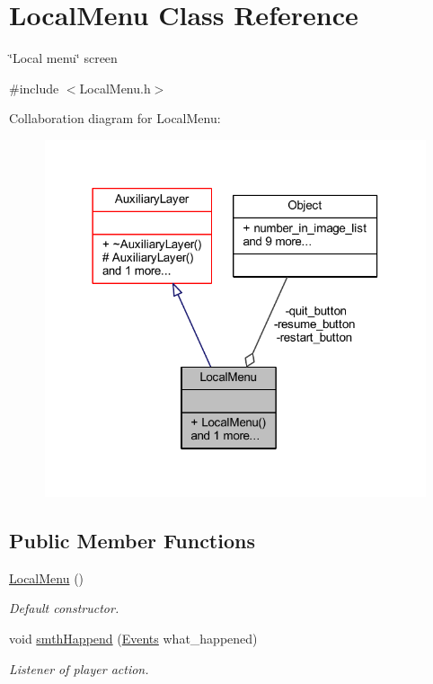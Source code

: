 \hypertarget{class_local_menu}{}\section{Local\+Menu Class Reference}
\label{class_local_menu}


\char`\"{}\+Local menu\char`\"{} screen  




{\ttfamily \#include $<$Local\+Menu.\+h$>$}



Collaboration diagram for Local\+Menu\+:\nopagebreak
\begin{figure}[H]
\begin{center}
\leavevmode
\includegraphics[width=318pt]{class_local_menu__coll__graph}
\end{center}
\end{figure}
\subsection*{Public Member Functions}
\begin{DoxyCompactItemize}
\item 
\mbox{\label{class_local_menu_a5e20a17475cf56d630a80e6972b44261}} 
\hyperlink{class_local_menu_a5e20a17475cf56d630a80e6972b44261}{Local\+Menu} ()
\begin{DoxyCompactList}\small\item\em Default constructor. \end{DoxyCompactList}\item 
void \hyperlink{class_local_menu_ad6db1f0ae5757a4e25269d40f6e369af}{smth\+Happend} (\hyperlink{_events_8h_af60e00b78607064c5be6aa9397ea49c1}{Events} what\+\_\+happened)
\begin{DoxyCompactList}\small\item\em Listener of player action. \end{DoxyCompactList}\end{DoxyCompactItemize}
